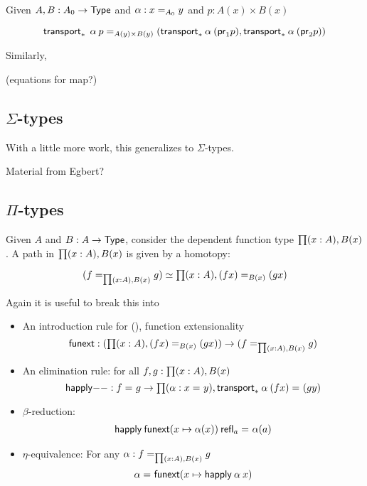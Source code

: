 Given $ A, B : A_0 \to \type$ and $\alpha : \id[A_0]{x}{y}$ 
and $p : A(x) \times B(x)$

\[
\id[A(y) \times B(y)]{\transport{x_0:A_0 \mapsto A(x_0) \times B(x_0)}
  \: \alpha \: {p}}
   {(\transport{x_0 \mapsto A(x_0)} \alpha \: (\proj{1} p), 
       \transport{x_0 \mapsto B(x_0)} \alpha \: (\proj{2} p))}
\]

Similarly, 

(equations for map?)

\subsection{$\Sigma$-types}

With a little more work, this generalizes to $\Sigma$-types. 

Material from Egbert?

\subsection{$\Pi$-types}

Given $A$ and $B : A \to \type$, consider the dependent function type $\prd{x:A}B(x)$.
A path in $\prd{x:A} B(x)$ is given by a homotopy:  

\[
\eqv{(\id[\prd{x:A} B(x)]{f}{g})}{\prd{x:A} \id[B(x)]{(f x)}{(g x)}}
\]

Again it is useful to break this into 

\begin{itemize}
\item An introduction rule for {()}, function extensionality
  \[
  \funext : (\prd{x:A} \id[B(x)]{(f x)}{(g x)}) \to {(\id[\prd{x:A} B(x)]{f}{g})}
  \]
\item An elimination rule: for all $f,g : \prd{x:A} B(x)$
  \[
  \happly{-}{-} : \id{f}{g} \to \prd{\alpha : \id{x}{y}} \id{\transport{B}{\alpha} \: {(f x)}}{(g y)}
  \]
\item $\beta$-reduction: 
  \[
  \begin{array}{l}
  \id{\happly \: {\funext{(x \mapsto \alpha(x))}} \: {\refl{a}}}{\alpha(a)}
  \end{array}
  \]
\item $\eta$-equivalence: For any $\alpha : \id[\prd{x:A} B(x)] f g$
  \[
  \id{\alpha}{\funext (x \mapsto \happly \: \alpha \: x)}
  \]
\end{itemize}


